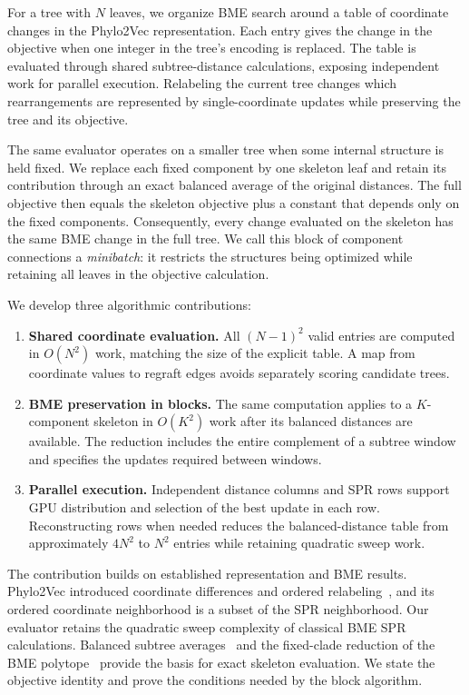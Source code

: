 \documentclass[11pt,a4paper]{article}
\makeatletter
\DeclareRobustCommand{\_}{\ifmmode\nfss@text{\textunderscore}\else\textunderscore\allowbreak\fi}
\theoremstyle{definition}
\makeatother
\begin{document}
For a tree with $N$ leaves, we organize BME search around a table of coordinate changes in the Phylo2Vec representation.
Each entry gives the change in the objective when one integer in the tree's encoding is replaced.
The table is evaluated through shared subtree-distance calculations, exposing independent work for parallel execution.
Relabeling the current tree changes which rearrangements are represented by single-coordinate updates while preserving the tree and its objective.

The same evaluator operates on a smaller tree when some internal structure is held fixed.
We replace each fixed component by one skeleton leaf and retain its contribution through an exact balanced average of the original distances.
The full objective then equals the skeleton objective plus a constant that depends only on the fixed components.
Consequently, every change evaluated on the skeleton has the same BME change in the full tree.
We call this block of component connections a \emph{minibatch}: it restricts the structures being optimized while retaining all leaves in the objective calculation.

\begin{samepage}
We develop three algorithmic contributions:
\begin{enumerate}
 \item \textbf{Shared coordinate evaluation.} All $(N-1)^2$ valid entries are computed in $O(N^2)$ work, matching the size of the explicit table. A map from coordinate values to regraft edges avoids separately scoring candidate trees.
 \item \textbf{BME preservation in blocks.} The same computation applies to a $K$-component skeleton in $O(K^2)$ work after its balanced distances are available. The reduction includes the entire complement of a subtree window and specifies the updates required between windows.
 \item \textbf{Parallel execution.} Independent distance columns and SPR rows support GPU distribution and selection of the best update in each row. Reconstructing rows when needed reduces the balanced-distance table from approximately $4N^2$ to $N^2$ entries while retaining quadratic sweep work.
\end{enumerate}
\end{samepage}

The contribution builds on established representation and BME results.
Phylo2Vec introduced coordinate differences and ordered relabeling~\cite[Section~1.3.2]{penn2024phylo2vec}, and its ordered coordinate neighborhood is a subset of the SPR neighborhood.
Our evaluator retains the quadratic sweep complexity of classical BME SPR calculations.
Balanced subtree averages~\cite{desper2002fast,desper2004theory} and the fixed-clade reduction of the BME polytope~\cite[Section~2.4]{haws2011optimality} provide the basis for exact skeleton evaluation.
We state the objective identity and prove the conditions needed by the block algorithm.
\end{document}
